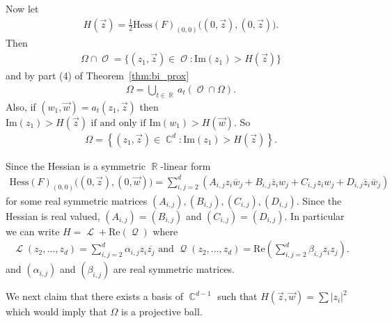 \documentclass[12pt]{amsart}
\theoremstyle{plain}
\theoremstyle{definition}
\theoremstyle{remark}
\begin{document}
Now let 
\begin{align*}
H(\vec{z}) = \frac{1}{2} \text{Hess}(F)_{(0, 0)}\Big( (0,\vec{z}),(0,\vec{z})\Big).
\end{align*}
Then
\begin{align*}
 \Omega \cap \operatorname{\mathcal{O}}= \{ (z_1,\vec{z}) \in \operatorname{\mathcal{O}}: \text{Im}(z_1) > H(\vec{z}) \}
\end{align*}
and by part (4) of Theorem~\ref{thm:bi_prox}
\begin{align*}
\Omega = \bigcup_{t \in \operatorname{\mathbb{R}}} a_t (\operatorname{\mathcal{O}} \cap \Omega).
\end{align*}
Also, if $(w_1, \vec{w}) = a_t (z_1,\vec{z})$ then $\text{Im}(z_1) > H(\vec{z}) \text{ if and only if } \text{Im}(w_1) > H(\vec{w})$. So
\begin{align*}
\Omega = \left\{ (z_1,\vec{z}) \in \operatorname{\mathbb{C}}^d: \text{Im}(z_1) > H(\vec{z}) \right\}.
\end{align*}

Since the Hessian is a symmetric $\operatorname{\mathbb{R}}$-linear form
\begin{align*}
 \mathrm{Hess}(F)_{(0,0)}  \Big( (0,\vec{z}), (0,\vec{w}) \Big)  = \sum_{i,j=2}^d \left(A_{i,j} z_i \overline{w}_j + B_{i,j} \overline{z}_i w_j + C_{i,j} z_i w_j + D_{i,j} \overline{z}_i \overline{w}_j\right)
 \end{align*}
 for some real symmetric matrices $(A_{i,j}), (B_{i,j}), (C_{i,j}), (D_{i,j})$. Since the Hessian is real valued, $(A_{i,j})=(B_{i,j})$ and $(C_{i,j})=(D_{i,j})$. In particular we can write $H = \operatorname{\mathcal{L}} + \textrm{Re}(\operatorname{\mathcal{Q}})$ where 
\begin{align*}
\operatorname{\mathcal{L}}(z_2, \dots, z_d) = \sum_{i,j=2}^d \alpha_{i,j} z_i \overline{z_j} \text{ and } \operatorname{\mathcal{Q}}(z_2, \dots, z_d) = \textrm{Re} \left(\sum_{i,j=2}^d \beta_{i,j} z_i z_j \right).
\end{align*}
and $(\alpha_{i,j})$ and $(\beta_{i,j})$ are real symmetric matrices. 
 
We next claim that there exists a basis of $\operatorname{\mathbb{C}}^{d-1}$ such that $H(\vec{z},\vec{w})=\sum {\left|{z_i}\right|}^2$ which would imply that $\Omega$ is a projective ball. 
\end{document}
